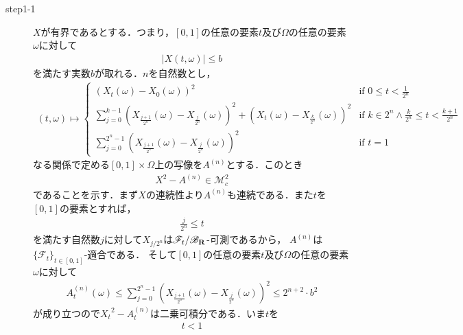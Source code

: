 	\begin{sketch}\mbox{}
		\begin{description}
			\item[step1-1] $X$が有界であるとする．つまり，$[0,1]$の任意の要素$t$及び$\Omega$の任意の要素$\omega$に対して
				\begin{align}
					|X(t,\omega)| \leq b
				\end{align}
				を満たす実数$b$が取れる．$n$を自然数とし，
				\begin{align}
					(t,\omega) \longmapsto 
					\begin{cases}
						\left( X_{t}(\omega) - X_{0}(\omega) \right)^{2} 
						&\mbox{if } {\displaystyle 0 \leq t < \frac{1}{2^{n}}} \\
						{\displaystyle \sum_{j=0}^{k-1} \left( X_{\frac{j+1}{2^{n}}}(\omega) - X_{\frac{j}{2^{n}}}(\omega) \right)^{2}
						+ \left( X_{t}(\omega) - X_{\frac{k}{2^{n}}}(\omega) \right)^{2}}
						&\mbox{if } {\displaystyle k \in 2^{n} \wedge \frac{k}{2^{n}} \leq t < \frac{k+1}{2^{n}}} \\
						{\displaystyle \sum_{j=0}^{2^{n}-1} \left( X_{\frac{j+1}{2^{n}}}(\omega) - X_{\frac{j}{2^{n}}}(\omega) \right)^{2}}
						&\mbox{if } t = 1
					\end{cases}
				\end{align}
				なる関係で定める$[0,1] \times \Omega$上の写像を$A^{(n)}$とする．このとき
				\begin{align}
					X^2 - A^{(n)} \in \mathscr{M}_{c}^{2}
					\label{fom:thm_decomposition_of_square_integrable_martingales_2}
				\end{align}
				であることを示す．まず$X$の連続性より$A^{(n)}$も連続である．また$t$を$[0,1]$の要素とすれば，
				\begin{align}
					\frac{j}{2^{n}} \leq t
				\end{align}
				を満たす自然数$j$に対して$X_{j/2^{n}}$は$\mathscr{F}_{t}/\mathscr{B}_{\mathbf{R}}$-可測であるから，
				$A^{(n)}$は$\{\mathscr{F}_t\}_{t \in [0,1]}$-適合である．
				そして$[0,1]$の任意の要素$t$及び$\Omega$の任意の要素$\omega$に対して
				\begin{align}
					A^{(n)}_{t}(\omega) 
					\leq \sum_{j=0}^{2^{n}-1} \left( X_{\frac{j+1}{2^{n}}}(\omega) - X_{\frac{j}{2^{n}}}(\omega) \right)^{2} 
					\leq 2^{n+2} \cdot b^{2}
				\end{align}
				が成り立つので${X_{t}}^{2} - A^{(n)}_{t}$は二乗可積分である．いま$t$を
				\begin{align}
					t < 1
				\end{align}

\end{description}
\end{sketch}
